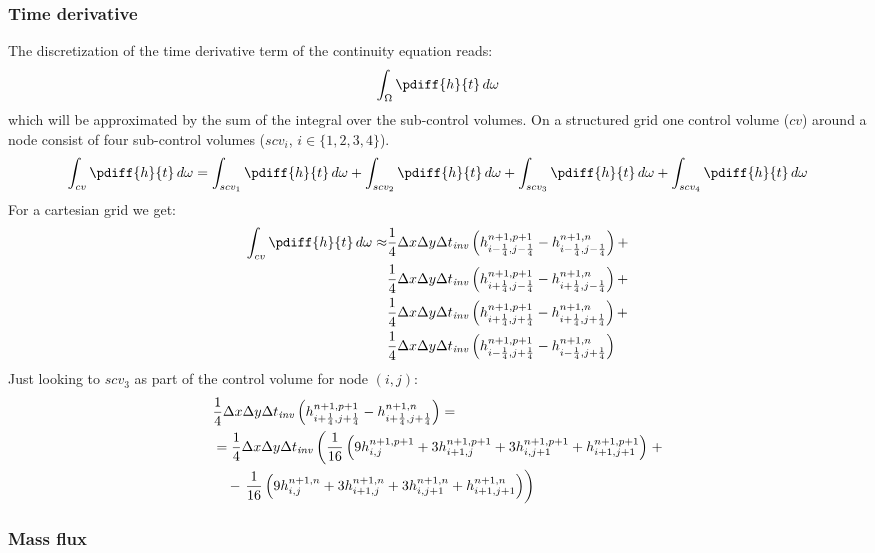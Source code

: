 \subsubsection{Time derivative}
The discretization of the time derivative term of the continuity equation reads:
\begin{align}
    \int_{\Omega} \pdiff{h}{t}\, d\omega
\end{align}
which will be approximated by the sum of the integral over the sub-control volumes.
On a structured grid one control volume ($cv$) around a node consist of four sub-control volumes ($scv_i$, $i\in\{1,2,3,4\}$).
\begin{align}
    \int_{cv} \pdiff{h}{t}\, d\omega =
    \int_{scv_1} \pdiff{h}{t}\, d\omega +
    \int_{scv_2} \pdiff{h}{t}\, d\omega +
    \int_{scv_3} \pdiff{h}{t}\, d\omega +
    \int_{scv_4} \pdiff{h}{t}\, d\omega
\end{align}
For a cartesian grid we get:
\begin{align}
    \int_{cv} \pdiff{h}{t}\, d\omega \approx &
    \quart\Dx\Dy\Dtinv \left( h^{n+1,p+1}_{i-\quart, j-\quart} -  h^{n+1,n}_{i-\quart, j-\quart} \right) +
    \nonumber \\*
    &\quart\Dx\Dy\Dtinv \left( h^{n+1,p+1}_{i+\quart, j-\quart} -  h^{n+1,n}_{i+\quart, j-\quart} \right) +
    \nonumber \\*
    &\quart\Dx\Dy\Dtinv \left( h^{n+1,p+1}_{i+\quart, j+\quart} -  h^{n+1,n}_{i+\quart, j+\quart} \right) +
    \nonumber \\*
    &\quart\Dx\Dy\Dtinv \left( h^{n+1,p+1}_{i-\quart, j+\quart} -  h^{n+1,n}_{i-\quart, j+\quart} \right)
\end{align}
Just looking to $scv_3$ as part of the control volume for node $(i,j)$:
\begin{align}
    &\frac{1}{4}\Delta x\Delta y\Delta t_{\it{inv}} \left( h^{n+1,p+1}_{i+\frac{1}{4}, j+\frac{1}{4}} -  h^{n+1,n}_{i+\frac{1}{4}, j+\frac{1}{4}} \right) =
    \\*
    &= \frac{1}{4}\Delta x\Delta y\Delta t_{\it{inv}} \left( \frac{1}{16}\left( 9h^{n+1,p+1}_{i, j} + 3 h^{n+1,p+1}_{i+1,j}  + 3  h^{n+1,p+1}_{i, j+1} + h^{n+1,p+1}_{i+1, j+1}\right) \right. +
    \\*
    &\quad - \left. \frac{1}{16}\left( 9 h^{n+1,n}_{i, j} +  3 h^{n+1,n}_{i+1,j}  + 3  h^{n+1,n}_{i, j+1} + h^{n+1,n}_{i+1, j+1}\right)\right)
\end{align}
\notyet
\subsubsection{Mass flux}
\notyet
